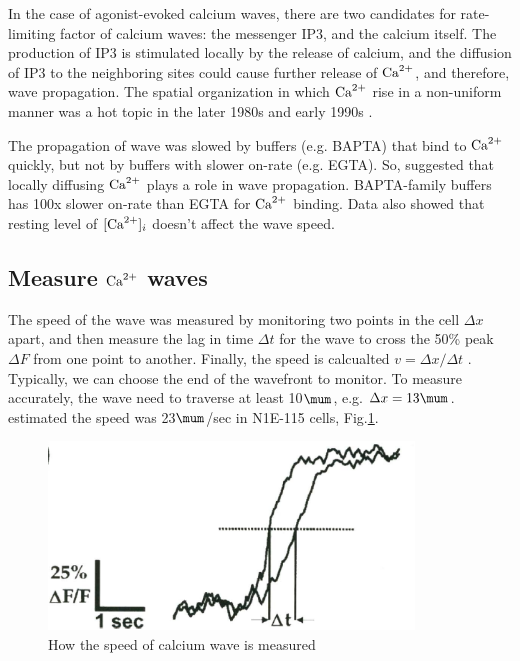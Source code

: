 In the case of agonist-evoked calcium waves, there are two candidates for
rate-limiting factor of calcium waves: the messenger IP3, and the calcium
itself. The production of IP3 is stimulated locally by the release of calcium,
and the diffusion of IP3 to the neighboring sites could cause further release of
${\text{Ca}^{2+}}$, and therefore, wave propagation. The spatial organization in which ${\text{Ca}^{2+}}$
rise in a non-uniform manner was a hot topic in the later 1980s and early 1990s
\citep{berridge1988, berridge1990, jacob1990, petersen1990, tsien1990,
meyer1991, thomas1992}.

The propagation of wave was slowed by buffers (e.g. BAPTA) that bind to ${\text{Ca}^{2+}}$
quickly, but not by buffers with slower on-rate (e.g. EGTA). So,
\citep{wang1993lpf} suggested that locally diffusing ${\text{Ca}^{2+}}$ plays a role in wave
propagation. BAPTA-family buffers has 100x slower on-rate than EGTA for ${\text{Ca}^{2+}}$
binding. Data also showed that resting level of $[{\text{Ca}^{2+}}]_i$ doesn't affect the
wave speed.

\subsection{Measure ${\text{Ca}^{2+}}$ waves}
\label{sec:measure_Ca-wave_IP3R}

The speed of the wave was measured by monitoring two points in the cell $\Delta
x$ apart, and then measure the lag in time $\Delta t$ for the wave to cross the
50\% peak $\Delta F$ from one point to another. Finally, the speed is calcualted
$v=\Delta x/\Delta t$ \citep{wang1993lpf}. Typically, we can choose the end of
the wavefront to monitor. To measure accurately, the wave need to traverse at
least 10$\mum$, e.g. $\Delta x=13\mum$. \citep{wang1993lpf} estimated the speed
was 23$\mum$/sec in N1E-115 cells, Fig.\ref{fig:measure_Ca-wave}.


\begin{figure}[hbt]
  \centerline{\includegraphics[height=5cm,
    angle=0]{./images/measure_Ca-waves.eps}}
\caption{How the speed of calcium wave is measured \citep{wang1993lpf}}
\label{fig:measure_Ca-wave}
\end{figure}


